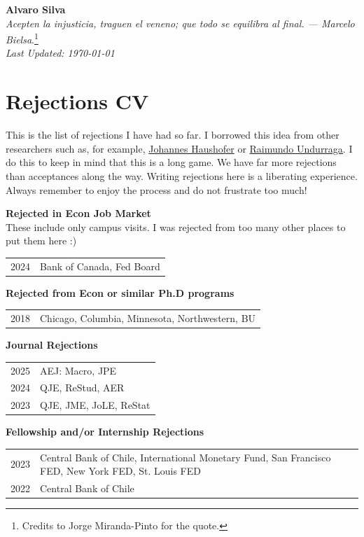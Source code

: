 \documentclass[12pt]{article}
\begin{document}
\begin{flushleft}
\textbf{Alvaro Silva}\\
\hfill \emph{Acepten la injusticia, traguen el veneno; que todo se equilibra al final. --- Marcelo Bielsa}.\footnote{Credits to Jorge Miranda-Pinto for the quote.}\\
\hfill \emph{Last Updated: \today}
\end{flushleft}


\section*{Rejections CV}
This is the list of rejections I have had so far. I borrowed this idea from other researchers such as, for example, \href{https://johanneshaushofer.com/cv-bio}{Johannes Haushofer} or \href{https://sites.google.com/site/raimundoundurragar/research}{Raimundo Undurraga}. I do this to keep in mind that this is a long game. We have far more rejections than acceptances along the way. Writing rejections here is a liberating experience. Always remember to enjoy the process and do not frustrate too much!

\textbf{Rejected in Econ Job Market}\\
These include only campus visits. I was rejected from too many other places to put them here :)\\
\begin{tabular}{lp{\dimexpr\textwidth-2cm}}
2024 & Bank of Canada, Fed Board
\end{tabular}


\textbf{Rejected from Econ or similar Ph.D programs}\\
\begin{tabular}{lp{\dimexpr\textwidth-2cm}}
2018 &  Chicago, Columbia, Minnesota, Northwestern, BU
\end{tabular}

\textbf{Journal Rejections}\\
\begin{tabular}{lp{\dimexpr\textwidth-2cm}}
    2025 & AEJ: Macro, JPE\\
    2024 & QJE, ReStud, AER\\
    2023 & QJE, JME, JoLE, ReStat
    \end{tabular}

\textbf{Fellowship and/or Internship Rejections}\\
\begin{tabular}{lp{\dimexpr\textwidth-2cm}}
    2023 &Central Bank of Chile, International Monetary Fund, San Francisco FED, New York FED, St. Louis FED\\
    2022 & Central Bank of Chile
    \end{tabular}
\end{document}
